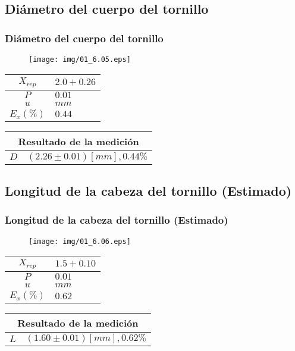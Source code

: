 \documentclass[letter,11pt]{beamer}
\begin{document}
\subsection{Diámetro del cuerpo del tornillo}
\begin{frame}
\frametitle{Diámetro del cuerpo del tornillo}
\vspace*{0.8cm}
\begin{figure}
\centering
\texttt{[image: img/01\_6.05.eps]}
\end{figure}
\vspace*{0.4cm}
\scriptsize
\begin{tabular}{|c|>{\centering}m{1.8cm}<{\centering}|}
\hline
$X_{rep}$ &  $2.0+0.26$ \tabularnewline \hline
      $P$ &      $0.01$ \tabularnewline \hline
      $u$ &        $mm$ \tabularnewline \hline
$E_x(\%)$ &      $0.44$ \tabularnewline \hline
\end{tabular}
\quad
\begin{tabular}{|c|>{\centering}m{5.7cm}<{\centering}|}
\hline
\multicolumn{2}{|c|}{\textbf{Resultado de la medición}} \\ \hline
$D$ & $( 2.26\pm0.01)[mm], 0.44\%$ \tabularnewline \hline
\end{tabular}
\end{frame}

\subsection{Longitud de la cabeza del tornillo (Estimado)}
\begin{frame}
\frametitle{Longitud de la cabeza del tornillo (Estimado)}
\vspace*{0.8cm}
\begin{figure}
\centering
\texttt{[image: img/01\_6.06.eps]}
\end{figure}
\vspace*{0.4cm}
\scriptsize
\begin{tabular}{|c|>{\centering}m{1.8cm}<{\centering}|}
\hline
$X_{rep}$ &  $1.5+0.10$ \tabularnewline \hline
      $P$ &      $0.01$ \tabularnewline \hline
      $u$ &        $mm$ \tabularnewline \hline
$E_x(\%)$ &      $0.62$ \tabularnewline \hline
\end{tabular}
\quad
\begin{tabular}{|c|>{\centering}m{5.7cm}<{\centering}|}
\hline
\multicolumn{2}{|c|}{\textbf{Resultado de la medición}} \\ \hline
$L$ & $( 1.60\pm0.01)[mm], 0.62\%$ \tabularnewline \hline
\end{tabular}
\end{frame}
\end{document}
